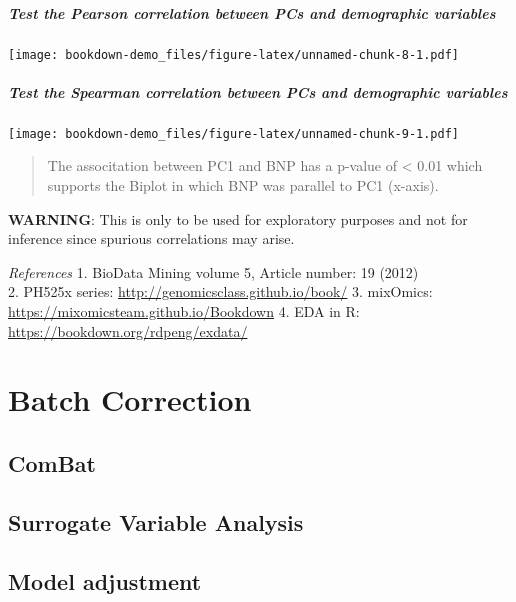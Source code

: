 \documentclass[]{book}
\let\oldparagraph\paragraph
\renewcommand{\paragraph}[1]{\oldparagraph{#1}\mbox{}}
\begin{document}
\paragraph{Test the Pearson correlation between PCs and demographic
variables}\label{test-the-pearson-correlation-between-pcs-and-demographic-variables}

\texttt{[image: bookdown-demo\_files/figure-latex/unnamed-chunk-8-1.pdf]}

\paragraph{Test the Spearman correlation between PCs and demographic
variables}\label{test-the-spearman-correlation-between-pcs-and-demographic-variables}

\texttt{[image: bookdown-demo\_files/figure-latex/unnamed-chunk-9-1.pdf]}

\begin{quote}
The associtation between PC1 and BNP has a p-value of \textless{} 0.01
which supports the Biplot in which BNP was parallel to PC1 (x-axis).
\end{quote}

\textbf{WARNING}: This is only to be used for exploratory purposes and
not for inference since spurious correlations may arise.

\emph{References} 1. BioData Mining volume 5, Article number: 19
(2012)\\
2. PH525x series: \url{http://genomicsclass.github.io/book/} 3.
mixOmics: \url{https://mixomicsteam.github.io/Bookdown} 4. EDA in R:
\url{https://bookdown.org/rdpeng/exdata/}

\chapter{Batch Correction}\label{batch-correction}

\section{ComBat}\label{combat}

\section{Surrogate Variable Analysis}\label{surrogate-variable-analysis}

\section{Model adjustment}\label{model-adjustment}
\end{document}
